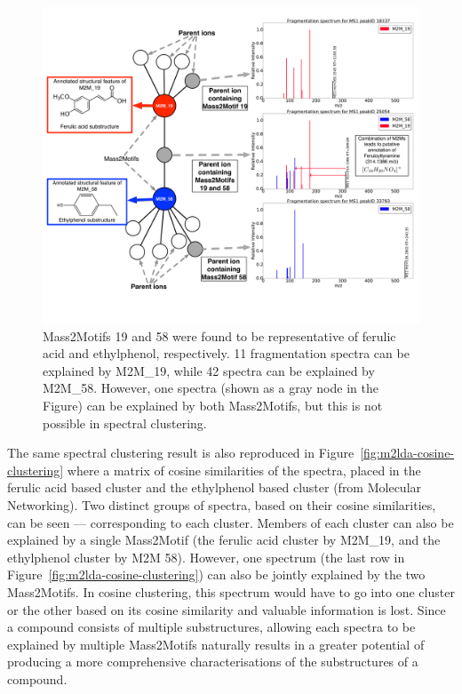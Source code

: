 \begin{figure}[!htbp]
\centering\includegraphics[width=1.0\linewidth]{07-lda/figures/combinedm2m.pdf}
\centering\caption[Mass2Motifs 19 and 58 were found to be representative of ferulic acid and ethylphenol, respectively. ]{Mass2Motifs 19 and 58 were found to be representative of ferulic acid and ethylphenol, respectively. 11 fragmentation spectra can be explained by M2M{\_}19, while 42 spectra can be explained by M2M{\_}58. However, one spectra (shown as a gray node in the Figure) can be explained by both Mass2Motifs, but this is not possible in spectral clustering.\label{fig:m2lda-combined-m2m}}
\end{figure}

The same spectral clustering result is also reproduced in Figure~\ref{fig:m2lda-cosine-clustering} where a matrix of cosine similarities of the spectra, placed in the ferulic acid based cluster and the ethylphenol based cluster (from Molecular Networking). Two distinct groups of spectra, based on their cosine similarities, can be seen --- corresponding to each cluster. Members of each cluster can also be explained by a single Mass2Motif (the ferulic acid cluster by M2M{\_}19, and the ethylphenol cluster by M2M 58). However, one spectrum (the last row in Figure~\ref{fig:m2lda-cosine-clustering}) can also be jointly explained by the two Mass2Motifs. In cosine clustering, this spectrum would have to go into one cluster or the other based on its cosine similarity and valuable information is lost. Since a compound consists of multiple substructures, allowing each spectra to be explained by multiple Mass2Motifs naturally results in a greater potential of producing a more comprehensive characterisations of the substructures of a compound. 


